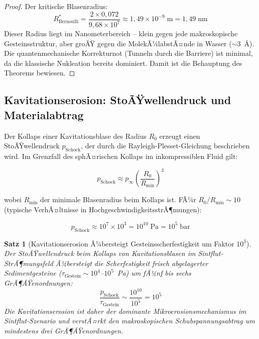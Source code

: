 ﻿\documentclass[12pt,a4paper]{report}
\newtheorem{theorem}{Satz}[chapter]
\begin{document}
\begin{proof}
	Der kritische Blasenradius:
	\begin{equation}
		R^*_\mathrm{Bernoulli} = \frac{2\times0{,}072}{9{,}68\times10^7} \approx 1{,}49\times10^{-9}\;\text{m} = 1{,}49\;\text{nm}
		\label{eq:kritischer_radius_numerisch}
	\end{equation}
	Dieser Radius liegt im Nanometerbereich -- klein gegen jede makroskopische Gesteinsstruktur, aber groÃŸ gegen die MolekÃ¼labstÃ¤nde in Wasser ($\sim 3$~\AA). Die quantenmechanische Korrekturnot (Tunneln durch die Barriere) ist minimal, da die klassische Nukleation bereits dominiert. Damit ist die Behauptung des Theorems bewiesen.
\end{proof}

\subsection{Kavitationserosion: StoÃŸwellendruck und Materialabtrag}

Der Kollaps einer Kavitationsblase des Radius $R_0$ erzeugt einen StoÃŸwellendruck $p_\mathrm{Schock}$, der durch die Rayleigh-Plesset-Gleichung beschrieben wird. Im Grenzfall des sphÃ¤rischen Kollaps im inkompressiblen Fluid gilt:

\begin{equation}
	p_\mathrm{Schock} \approx p_\infty\left(\frac{R_0}{R_\mathrm{min}}\right)^3
	\label{eq:schockdruck}
\end{equation}

wobei $R_\mathrm{min}$ der minimale Blasenradius beim Kollaps ist. FÃ¼r $R_0/R_\mathrm{min} \sim 10$ (typische VerhÃ¤ltnisse in HochgeschwindigkeitsstrÃ¶mungen):

\begin{equation}
	p_\mathrm{Schock} \approx 10^7 \times 10^3 = 10^{10}\;\text{Pa} = 10^5\;\text{bar}
	\label{eq:schockdruck_numerisch}
\end{equation}

\begin{theorem}[Kavitationserosion Ã¼bersteigt Gesteinsscherfestigkeit um Faktor $10^3$]
	\label{thm:kavitationserosion}
	Der StoÃŸwellendruck beim Kollaps von Kavitationsblasen im Sintflut-StrÃ¶mungsfeld Ã¼bersteigt die Scherfestigkeit frisch abgelagerter Sedimentgesteine ($\tau_\mathrm{Gestein} \sim 10^4$--$10^5$~Pa) um fÃ¼nf bis sechs GrÃ¶ÃŸenordnungen:
	\begin{equation}
		\frac{p_\mathrm{Schock}}{\tau_\mathrm{Gestein}} \sim \frac{10^{10}}{10^5} = 10^5
		\label{eq:erosion_verhaeltnis}
	\end{equation}
	Die Kavitationserosion ist daher der dominante Mikroerosionsmechanismus im Sintflut-Szenario und verstÃ¤rkt den makroskopischen Schubspannungsabtrag um mindestens drei GrÃ¶ÃŸenordnungen.
\end{theorem}
\end{document}
